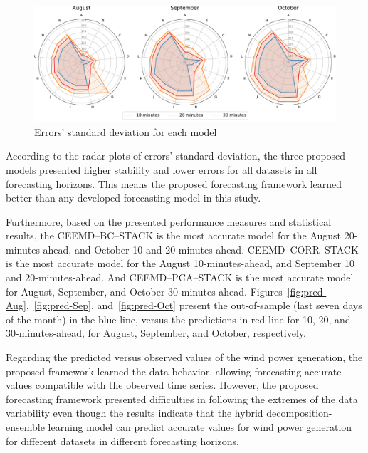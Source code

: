 \begin{figure}[htb!]
    \centering
    \includegraphics[width=\linewidth]{Media/cs2_radarplot.pdf}
    \caption{Errors' standard deviation for each model}
    \label{fig:radarplotcs2}
\end{figure}

According to the radar plots of errors' standard deviation, the three proposed models presented higher stability and lower errors for all datasets in all forecasting horizons. This means the proposed forecasting framework learned better than any developed forecasting model in this study.

Furthermore, based on the presented performance measures and statistical results, the \ac{CEEMD}--\ac{BC}--\ac{STACK} is the most accurate model for the August 20-minutes-ahead, and October 10 and 20-minutes-ahead. \ac{CEEMD}--\ac{CORR}--\ac{STACK} is the most accurate model for the August 10-minutes-ahead, and September 10 and 20-minutes-ahead. And \ac{CEEMD}--\ac{PCA}--\ac{STACK} is the most accurate model for August, September, and October 30-minutes-ahead. Figures~\ref{fig:pred-Aug},~\ref{fig:pred-Sep}, and~\ref{fig:pred-Oct} present the out-of-sample (last seven days of the month) in the blue line, versus the predictions in red line for 10, 20, and 30-minutes-ahead, for August, September, and October, respectively.

Regarding the predicted versus observed values of the wind power generation, the proposed framework learned the data behavior, allowing forecasting accurate values compatible with the observed time series. However, the proposed forecasting framework presented difficulties in following the extremes of the data variability even though the results indicate that the hybrid decomposition-ensemble learning model can predict accurate values for wind power generation for different datasets in different forecasting horizons.


